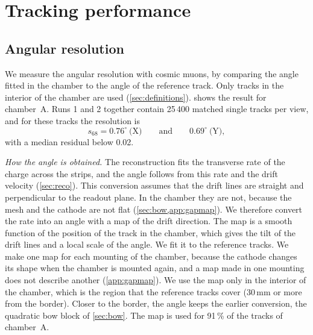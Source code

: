 \section{Tracking performance}\label{sec:tracking}

\subsection{Angular resolution}\label{sec:angle}
We measure the angular resolution with cosmic muons, by comparing the angle fitted in the chamber to the angle of
the reference track. Only tracks in the interior of the chamber are used (\cref{sec:definitions}). 
shows the result for chamber~A. Runs 1 and 2 together contain 25\,400 matched single tracks per view, and for these
tracks the resolution is
\[ s_{68}=0.76^\circ\ \text{(X)}\qquad\text{and}\qquad 0.69^\circ\ \text{(Y)}, \]
with a median residual below 0.02\textdegree.

\emph{How the angle is obtained.} The reconstruction fits the transverse rate of the charge across the strips, and the
angle follows from this rate and the drift velocity (\cref{sec:reco}). This conversion assumes that the drift lines are
straight and perpendicular to the readout plane. In the chamber they are not, because the mesh and the cathode are
not flat (\cref{sec:bow,app:gapmap}). We therefore convert the rate into an angle with a map of the drift direction.
The map is a smooth function of the position of the track in the chamber, which gives the tilt of the drift lines and
a local scale of the angle. We fit it to the reference tracks. We make one map for each mounting of the chamber,
because the cathode changes its shape when the chamber is mounted again, and a map made in one mounting does not
describe another (\cref{app:gapmap}). We use the map only in the interior of the chamber, which is the region that
the reference tracks cover (30\,mm or more from the border). Closer to the border, the angle keeps the earlier
conversion, the quadratic bow block of \cref{sec:bow}. The map is used for 91\,\% of the tracks of
chamber~A.

